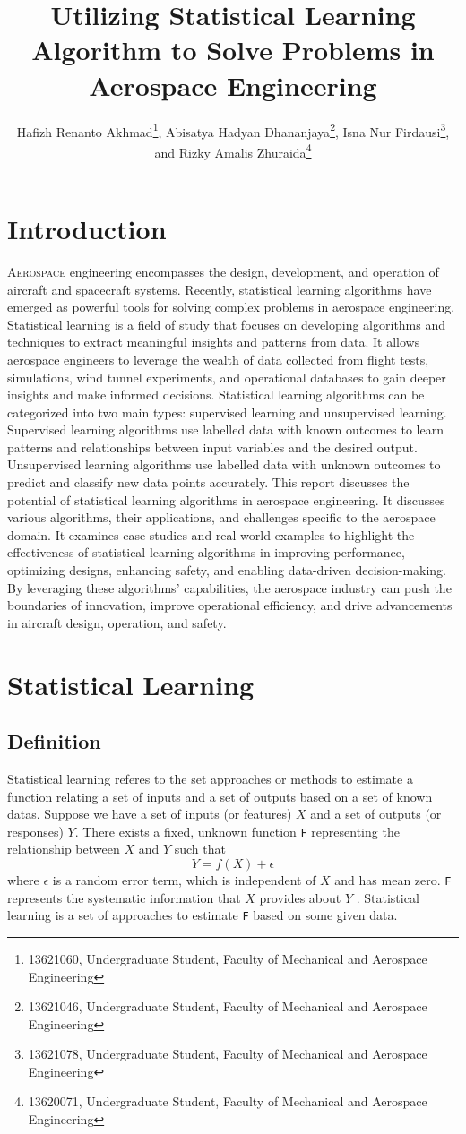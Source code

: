 \documentclass[conf]{new-aiaa}
\title{Utilizing Statistical Learning Algorithm to Solve Problems in Aerospace Engineering}
\author{Hafizh Renanto Akhmad\footnote{13621060, Undergraduate Student, Faculty of Mechanical and Aerospace Engineering}, Abisatya Hadyan Dhananjaya\footnote{13621046, Undergraduate Student, Faculty of Mechanical and Aerospace Engineering}, Isna Nur Firdausi\footnote{13621078, Undergraduate Student, Faculty of Mechanical and Aerospace Engineering}, and Rizky Amalis Zhuraida\footnote{13620071, Undergraduate Student, Faculty of Mechanical and Aerospace Engineering}}
\affil{Institut Teknologi Bandung, Bandung, Jawa Barat, 40132}
\begin{document}
\maketitle

\section{Introduction}
\lettrine{A}{erospace} engineering encompasses the design, development, and operation of aircraft and spacecraft systems. Recently, statistical learning algorithms have emerged as powerful tools for solving complex problems in aerospace engineering. Statistical learning is a field of study that focuses on developing algorithms and techniques to extract meaningful insights and patterns from data. It allows aerospace engineers to leverage the wealth of data collected from flight tests, simulations, wind tunnel experiments, and operational databases to gain deeper insights and make informed decisions. Statistical learning algorithms can be categorized into two main types: supervised learning and unsupervised learning. 
Supervised learning algorithms use labelled data with known outcomes to learn patterns and relationships between input variables and the desired output. Unsupervised learning algorithms use labelled data with unknown outcomes to predict and classify new data points accurately. This report discusses the potential of statistical learning algorithms in aerospace engineering. It discusses various algorithms, their applications, and challenges specific to the aerospace domain. It examines case studies and real-world examples to highlight the effectiveness of statistical learning algorithms in improving performance, optimizing designs, enhancing safety, and enabling data-driven decision-making. By leveraging these algorithms' capabilities, the aerospace industry can push the boundaries of innovation, improve operational efficiency, and drive advancements in aircraft design, operation, and safety.


\section{Statistical Learning}
\subsection{Definition}
Statistical learning referes to the set approaches or methods to estimate a function relating a set of inputs and a set of outputs based on a set of known datas. Suppose we have a set of inputs (or features) $X$ and a set of outputs (or responses) $Y$. There exists a fixed, unknown function \texttt{F} representing the relationship between $X$ and $Y$ such that 
\begin{equation} \label{eq:statslearndef}
    Y = f(X) + \epsilon
\end{equation}
where $\epsilon$ is a random error term, which is independent of $X$ and has mean zero. \texttt{F} represents the systematic information that $X$ provides about $Y$ \citet{James_2017}. Statistical learning is a set of approaches to estimate \texttt{F} based on some given data.
\end{document}
